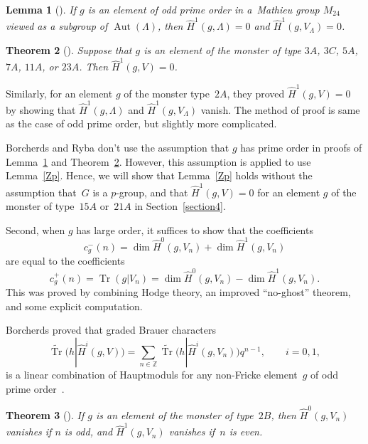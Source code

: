 \documentclass[pdftex]{sigma}%
\numberwithin{equation}{section}
\newtheorem{Theorem}{Theorem}[section]
\newtheorem{Lemma}[Theorem]{Lemma}
\begin{document}
\begin{Lemma}[{\cite[Lemma 4.5 and Theorem~4.6]{BR}}]\label{lattice}
If $g$ is an element of odd prime order in a~Mathieu group $M_{24}$ viewed as a subgroup of $\operatorname{Aut}(\Lambda)$, then $\hat{H}^1(g,\Lambda)=0$ and $\hat{H}^1(g,V_\Lambda)=0$.
\end{Lemma}

\begin{Theorem}[{\cite[Theorem 4.7]{BR}}]\label{pA}
Suppose that $g$ is an element of the monster of type $3A$, $3C$, $5A$, $7A$, $11A$, or $23A$. Then $\hat{H}^1(g,V)=0$.
\end{Theorem}

\begin{Remark}
Similarly, for an element $g$ of the monster type~$2A$, they proved $\hat{H}^1(g,V)=0$ by showing that $\hat{H}^1(g,\Lambda)$ and $\hat{H}^1(g,V_\Lambda)$ vanish. The method of proof is same as the case of odd prime order, but slightly more complicated.
\end{Remark}

Borcherds and Ryba don't use the assumption that $g$ has prime order in proofs of Lemma~\ref{lattice} and Theorem~\ref{pA}. However, this assumption is applied to use Lemma~\ref{Zp}. Hence, we will show that Lemma~\ref{Zp} holds without the assumption that~$G$ is a $p$-group, and that $\hat{H}^1(g,V)=0$ for an element $g$ of the monster of type~$15A$ or~$21A$ in Section~\ref{section4}.

 Second, when $g$ has large order, it suffices to show that the coefficients
\[
 c_g^-(n)=\dim\hat{H}^0(g,V_n)+\dim \hat{H}^1(g,V_n)
\]
 are equal to the coefficients
\[
 c_g^+(n)=\operatorname{Tr}(g|V_n)=\dim \hat{H}^0(g,V_n)-\dim \hat{H}^1(g,V_n).
\]
This was proved by combining Hodge theory, an improved ``no-ghost'' theorem, and some explicit computation.

Borcherds proved that graded Brauer characters
\[
\widetilde{\operatorname{Tr}}(h|{\hat{H}}^i(g,V))=\sum_{n \in \mathbb{Z}} \widetilde{\operatorname{Tr}}\big(h|{\hat{H}}^i(g,V_n)\big)q^{n-1}, \qquad i=0,1,
\]
 is a linear combination of Hauptmoduls for any non-Fricke element~$g$ of odd prime order~\cite{B98,BR}.

\begin{Theorem}[{\cite[Theorem 5.3]{BR}}]
If $g$ is an element of the monster of type~$2B$, then $\hat{H}^0(g,V_n)$ vanishes if $n$ is odd, and $\hat{H}^1(g,V_n)$ vanishes if~$n$ is even.
\end{Theorem}
\end{document}
